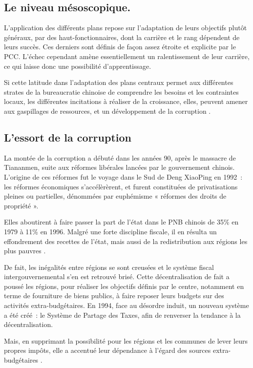 \documentclass[a4paper]{article}
\begin{document}
\subsection{Le niveau mésoscopique.}
\label{sec:orgc8b3031}
L’application des différents plans repose sur l’adaptation de leurs objectifs plutôt généraux, par des haut-fonctionnaires, dont la carrière et le rang dépendent de leurs succès. Ces derniers sont définis de façon assez étroite et explicite par le PCC. L’échec cependant amène essentiellement un ralentissement de leur carrière, ce qui laisse donc une possibilité d’apprentissage.

Si cette latitude dans l’adaptation des plans centraux permet aux différentes strates de la bureaucratie chinoise de comprendre les besoins et les contraintes locaux, les différentes incitations à réaliser de la croissance, elles, peuvent amener aux gaspillages de ressources, et un développement de la corruption \cite{ang16_how_china}.

\subsection{L’essort de la corruption}
\label{sec:orga8aaf5f}
La montée de la corruption a débuté dans les années 90, après le massacre de Tiananmen, suite aux réformes libérales lancées par le gouvernement chinois. L’origine de ces réformes fut le voyage dans le Sud de Deng XiaoPing en 1992~: les réformes économiques s'accélèrèrent, et furent constituées de privatisations pleines ou partielles, dénommées par euphémisme « réformes des droits de propriété ».

Elles aboutirent à faire passer la part de l’état dans le PNB chinois de 35\% en 1979 à 11\% en 1996. Malgré une forte discipline fiscale, il en résulta un effondrement des recettes de l’état, mais aussi de la redistribution aux régions les plus pauvres \cite{wong09_rebuil_gover_centur}.

De fait, les inégalités entre régions se sont creusées et le système fiscal intergouvernemental s’en est retrouvé brisé. Cette décentralisation de fait a poussé les régions, pour réaliser les objectifs définis par le centre, notamment en terme de fourniture de biens publics, à faire reposer leurs budgets sur des activités extra-budgétaires. En 1994, face au désordre induit, un nouveau système a été créé~: le Système de Partage des Taxes, afin de renverser la tendance à la décentralisation.

Mais, en supprimant la possibilité pour les régions et les communes de lever leurs propres impôts, elle a accentué leur dépendance à l’égard des sources extra-budgétaires \cite{wong09_rebuil_gover_centur}.
\end{document}

